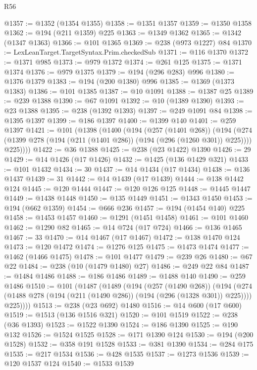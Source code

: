 \begin{lexlean}{R56}
\begin{coremodule}
@1357 := @1352 (@1354 @1355)
@1358 := @1351 @1357
@1359 := @1350 @1358
@1362 := @194 (@211 @1359) @225
@1363 := @1349 @1362
@1365 := @1342 (@1347 @1363)
@1366 := @101 @1365
@1369 := @238 (@973 @1227) @84
@1370 := LexLeanTarget.TargetSyntax.Prim.checkedSub
@1371 := @116 @1370
@1372 := @1371 @985
@1373 := @979 @1372
@1374 := @261 @125
@1375 := @1371 @1374
@1376 := @979 @1375
@1379 := @194 (@296 @283) @996
@1380 := @1376 @1379
@1383 := @194 (@200 @1380) @996
@1385 := @1369 (@1373 @1383)
@1386 := @101 @1385
@1387 := @10 @1091
@1388 := @1387 @25
@1389 := @239 @1388
@1390 := @67 @1091
@1392 := @10 (@1389 @1390)
@1393 := @23 @1388
@1395 := @238 (@1392 @1393)
@1397 := @249 @1091 @84
@1398 := @1395 @1397
@1399 := @186 @1397
@1400 := @1399 @140
@1401 := @259 @1397
@1421 := @101
    (@1398
      (@1400
        (@194
          (@257 (@1401 @268))
          (@194
            (@274 (@1399 @278 (@194 (@211 (@1401 @286)) (@194 (@296 (@1260 @301)) @225))))
            @225))))
@1422 := @36 @1388
@1425 := @238 (@23 @1422) @1390
@1426 := 29
@1429 := @14 @1426 (@17 @1426)
@1432 := @1425 (@136 @1429 @321)
@1433 := @101 @1432
@1434 := 30
@1437 := @14 @1434 (@17 @1434)
@1438 := @136 @1437
@1439 := 31
@1442 := @14 @1439 (@17 @1439)
@1444 := @138 @1442 @124
@1445 := @120 @1444
@1447 := @120 @126 @125
@1448 := @1445 @1447
@1449 := @1438 @1448
@1450 := @135 @1449
@1451 := @1343 @1450
@1453 := @194 (@662 @1359)
@1454 := @666 @236
@1457 := @194 (@1454 @140) @225
@1458 := @1453 @1457
@1460 := @1291 (@1451 @1458)
@1461 := @101 @1460
@1462 := @1290 @82
@1465 := @14 @724 (@17 @724)
@1466 := @136 @1465
@1467 := 33
@1470 := @14 @1467 (@17 @1467)
@1472 := @138 @1470 @124
@1473 := @120 @1472
@1474 := @1276 @125
@1475 := @1473 @1474
@1477 := @1462 (@1466 @1475)
@1478 := @101 @1477
@1479 := @239 @26
@1480 := @67 @22
@1484 := @238 (@10 (@1479 @1480) @27)
@1486 := @249 @22 @84
@1487 := @1484 @1486
@1488 := @186 @1486
@1489 := @1488 @140
@1490 := @259 @1486
@1510 := @101
    (@1487
      (@1489
        (@194
          (@257 (@1490 @268))
          (@194
            (@274 (@1488 @278 (@194 (@211 (@1490 @286)) (@194 (@296 (@1328 @301)) @225))))
            @225))))
@1513 := @238 (@23 @692) @1480
@1516 := @14 @600 (@17 @600)
@1519 := @1513 (@136 @1516 @321)
@1520 := @101 @1519
@1522 := @238 (@36 @1393)
@1523 := @1522 @1390
@1524 := @186 @1390
@1525 := @190 @132
@1526 := @1524 @1525
@1528 := @171 @1390 @124
@1530 := @194 (@200 @1528)
@1532 := @358 @191 @1528
@1533 := @381 @1390
@1534 := @284 @175
@1535 := @217 @1534
@1536 := @428 @1535
@1537 := @1273 @1536
@1539 := @120 @1537 @124
@1540 := @1533 @1539

\end{coremodule}
\end{lexlean}
